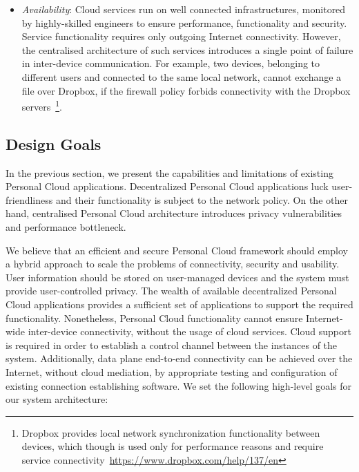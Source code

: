 \begin{itemize}
\item {\it Availability}\/: Cloud services run on well connected
      infrastructures, monitored by highly-skilled engineers to ensure
      performance, functionality and security. Service functionality requires
      only outgoing Internet connectivity.  However, the centralised
      architecture of such services introduces a single point of failure in
      inter-device communication. For example, two devices, belonging to
      different users and connected to the same local network, cannot exchange a
      file over Dropbox, if the firewall policy forbids connectivity with the
      Dropbox servers~\footnote{Dropbox provides local network synchronization
        functionality between devices, which though is used only for performance
        reasons and require service
        connectivity~\url{https://www.dropbox.com/help/137/en}}. 

\end{itemize}

\subsection{Design Goals} \label{sec:sp-challenges}

In the previous section, we present the capabilities and limitations of existing
Personal Cloud applications. Decentralized Personal Cloud applications luck
user-friendliness and their functionality is subject to the network
policy. On the other hand, centralised Personal Cloud architecture introduces
privacy vulnerabilities~\cite{facebook-nsa} and performance bottleneck.  

We believe that an efficient and secure Personal Cloud framework should employ a
hybrid approach to scale the problems of connectivity, security and usability.
User information should be stored on user-managed devices and the system must
provide user-controlled privacy.  The wealth of available decentralized Personal
Cloud applications  provides a sufficient set of applications to support the
required functionality.  Nonetheless, Personal Cloud functionality cannot ensure
Internet-wide inter-device connectivity, without the usage of cloud services.
Cloud support is required in order to establish  a control channel between the
instances of the system. Additionally, data plane end-to-end connectivity can be
achieved over the Internet, without cloud mediation, by appropriate testing and
configuration of existing connection establishing software.  We set the
following high-level goals for our system architecture:

